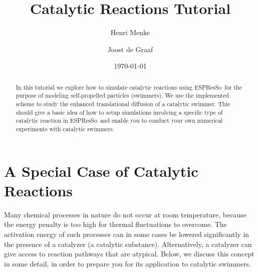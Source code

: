 \documentclass[aip,jcp,reprint,a4paper,onecolumn,nofootinbib,amsmath,amssymb]{revtex4-1}
\newcommand{\es}{\mbox{\textsf{ESPResSo}}\xspace}
\begin{document}
\title{Catalytic Reactions Tutorial}
\author{Henri Menke}
\author{Joost de Graaf}
\date{\today}

\begin{abstract}
  In this tutorial we explore how to simulate catalytic reactions using \es\ for the purpose of modeling self-propelled particles (swimmers). We use the implemented scheme to study the enhanced translational diffusion of a catalytic swimmer. This should give a basic idea of how to setup simulations involving a specific type of catalytic reaction in \es\ and enable you to conduct your own numerical experiments with catalytic swimmers.
\end{abstract}

\maketitle

\section{A Special Case of Catalytic Reactions}

Many chemical processes in nature do not occur at room temperature, because the energy penalty is too high for thermal fluctuations to overcome. The activation energy of such processes can in some cases be lowered significantly in the presence of a catalyzer (a catalytic substance). Alternatively, a catalyzer can give access to reaction pathways that are atypical. Below, we discuss this concept in some detail, in order to prepare you for its application to catalytic swimmers.
\end{document}
